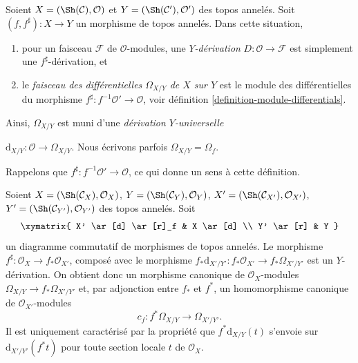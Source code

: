 \begin{definition}

\label{definition-sheaf-differentials}

Soient $X = (\Sh(\mathcal{C}), \mathcal{O})$ et
$Y = (\Sh(\mathcal{C}'), \mathcal{O}')$ des topos annelés. Soit
$(f, f^\sharp) : X \to Y$ un morphisme de topos annelés. Dans cette situation,

\begin{enumerate}

\item pour un faisceau $\mathcal{F}$ de $\mathcal{O}$-modules, une
{\it $Y$-dérivation} $D : \mathcal{O} \to \mathcal{F}$ est simplement une
$f^\sharp$-dérivation, et
\item le {\it faisceau des différentielles $\Omega_{X/Y}$ de $X$ sur $Y$}
est le module des différentielles du morphisme
$f^\sharp : f^{-1}\mathcal{O}' \to \mathcal{O}$, voir définition \ref{definition-module-differentials}.

\end{enumerate}

Ainsi, $\Omega_{X/Y}$ est muni d'une {\it dérivation $Y$-universelle}

$\text{d}_{X/Y} : \mathcal{O} \longrightarrow \Omega_{X/Y}$. Nous écrivons parfois $\Omega_{X/Y} = \Omega_f$.

\end{definition}

\noindent
Rappelons que $f^\sharp : f^{-1}\mathcal{O}' \to \mathcal{O}$, ce qui donne
un sens à cette définition.

\begin{lemma}

\label{lemma-functoriality-differentials-ringed-topoi}

Soient
$X = (\Sh(\mathcal{C}_X), \mathcal{O}_X)$,
$Y = (\Sh(\mathcal{C}_Y), \mathcal{O}_Y)$,
$X' = (\Sh(\mathcal{C}_{X'}), \mathcal{O}_{X'})$,
$Y' = (\Sh(\mathcal{C}_{Y'}), \mathcal{O}_{Y'})$ des topos annelés. Soit
$$
\xymatrix{
X' \ar[d] \ar[r]_f & X \ar[d] \\
Y' \ar[r] & Y
}
$$
un diagramme commutatif de morphismes de topos annelés. Le morphisme
$f^\sharp : \mathcal{O}_X \to f_*\mathcal{O}_{X'}$, composé avec le morphisme
$f_*\text{d}_{X'/Y'} : f_*\mathcal{O}_{X'} \to f_*\Omega_{X'/Y'}$ est un
$Y$-dérivation. On obtient donc un morphisme canonique de
$\mathcal{O}_X$-modules $\Omega_{X/Y} \to f_*\Omega_{X'/Y'}$ et, par
adjonction entre $f_*$ et $f^*$, un homomorphisme canonique de
$\mathcal{O}_{X'}$-modules
$$
c_f : f^*\Omega_{X/Y} \longrightarrow \Omega_{X'/Y'}.
$$
Il est uniquement caractérisé par la propriété que
$f^*\text{d}_{X/Y}(t)$ s'envoie sur $\text{d}_{X'/Y'}(f^* t)$ pour toute
section locale $t$ de $\mathcal{O}_X$.

\end{lemma}

